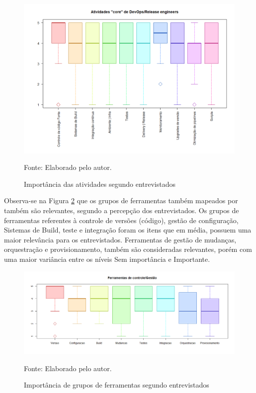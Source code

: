 \documentclass[twoside,english,brazilian]{UNISINOSartigo}
\newcommand{\source}[1]{\caption*{Fonte: {#1}} }
\begin{document}
\begin{figure}[H]
    \centering
    \caption{Importância das atividades segundo entrevistados}
       \includegraphics[scale=.5]{imagens/Rplot.png}
        \source{Elaborado pelo autor.}
    \label{fig:importanciapratDevOps}
\end{figure}
Observa-se na Figura \ref{fig:importFerramentas} que os grupos de ferramentas também mapeados por  também são relevantes, segundo a percepção dos entrevistados. Os grupos de ferramentas referentes à controle de versões (código), gestão de configuração, Sistemas de Build, teste e integração foram os itens que em média, possuem uma maior relevância para os entrevistados. Ferramentas de gestão de mudanças, orquestração e provisionamento, também são consideradas relevantes, porém com uma maior variância entre os níveis Sem importância e Importante.
\begin{figure}[H]
    \centering
    \caption{Importância de grupos de ferramentas segundo entrevistados}
       \includegraphics[scale=.5]{imagens/Rplot05.png}
        \source{Elaborado pelo autor.}
    \label{fig:importFerramentas}
\end{figure}
\end{document}
